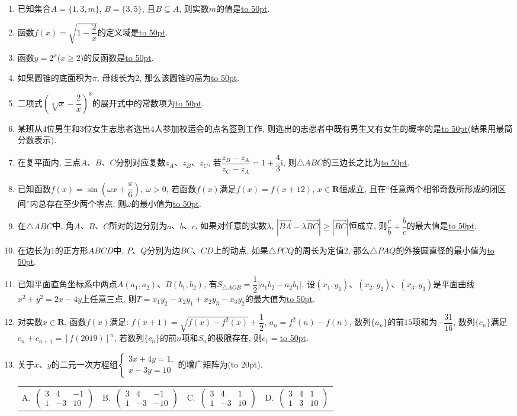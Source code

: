 \documentclass[10pt,a4paper]{article}
\newcommand{\blank}[1]{\underline{\hbox to #1pt{}}}
\newcommand{\bracket}[1]{(\hbox to #1pt{})}
\newcommand{\fourch}[4]{\par\begin{tabular}{p{.23\textwidth}p{.23\textwidth}p{.23\textwidth}p{.23\textwidth}}
A.~#1 &B.~#2& C.~#3& D.~#4
\end{tabular}}
\begin{document}
\begin{enumerate}[1.]
\item 已知集合$A=\{1,3,m\}$, $B=\{3,5\}$, 且$B\subseteq A$, 则实数$m$的值是\blank{50}.
\item 函数$f(x)=\sqrt{1-\dfrac 2x}$的定义域是\blank{50}.
\item 函数$y=2^x$($x\ge 2$)的反函数是\blank{50}.
\item 如果圆锥的底面积为$\pi$, 母线长为$2$, 那么该圆锥的高为\blank{50}.
\item 二项式$(\sqrt[3]x-\dfrac 2x)^8$的展开式中的常数项为\blank{50}.
\item 某班从$4$位男生和$3$位女生志愿者选出$4$人参加校运会的点名签到工作, 则选出的志愿者中既有男生又有女生的概率的是\blank{50}(结果用最简分数表示).
\item 在复平面内, 三点$A$、$B$、$C$分别对应复数$z_A$、$z_B$、$z_C$, 若$\dfrac{z_B-z_A}{z_C-z_A}=1+\dfrac 43\mathrm{i}$, 则$\triangle ABC$的三边长之比为\blank{50}.
\item 已知函数$f(x)=\sin (\omega x+\dfrac{\pi }6), \ \omega >0$, 若函数$f(x)$满足$f(x)=f(x+12)$, $x\in \mathbf{R}$恒成立, 且在``任意两个相邻奇数所形成的闭区间''内总存在至少两个零点, 则$\omega$的最小值为\blank{50}.
\item 在$\triangle ABC$中, 角$A$、$B$、$C$所对的边分别为$a$、$b$、$c$, 如果对任意的实数$\lambda$, $|\overrightarrow{BA}-\lambda \overrightarrow{BC}|\ge |\overrightarrow{BC}|$恒成立, 则$\dfrac cb+\dfrac bc$的最大值是\blank{50}.
\item 在边长为1的正方形$ABCD$中, $P$、$Q$分别为边$BC$、$CD$上的动点, 如果$\triangle PCQ$的周长为定值$2$, 那么$\triangle PAQ$的外接圆直径的最小值为\blank{50}.
\item 已知平面直角坐标系中两点$A(a_1,a_2)$、$B(b_1,b_2)$, 有$S_{\triangle AOB}=\dfrac 12|a_1b_2-a_2b_1|$. 设$(x_1,y_1)$、$(x_2,y_2)$、$(x_3,y_3)$是平面曲线$x^2+y^2=2x-4y$上任意三点, 则$T=x_1y_2-x_2y_1+x_2y_3-x_3y_2$的最大值为\blank{50}.
\item 对实数$x\in \mathbf{R}$, 函数$f(x)$满足: $f(x+1)=\sqrt{f(x)-{f^2}(x)}+\dfrac 12$, $a_n=f^2(n)-f(n)$,
数列$\{a_n\}$的前$15$项和为$-\dfrac{31}{16}$, 数列$\{c_n\}$满足$c_n+c_{n+1}=[f(2019)]^n$, 若数列$\{c_n\}$的前$n$项和$S_n$的极限存在, 则$c_1=$\blank{50}.
\item 关于$x$、$y$的二元一次方程组$\begin{cases} 3x+4y=1,\\ x-3y=10 \end{cases}$的增广矩阵为\bracket{20}.
\fourch{$\begin{pmatrix}3&4&-1\\1&-3&10\end{pmatrix}$}{$\begin{pmatrix}3&4&-1\\1&-3&-10\end{pmatrix}$}{$\begin{pmatrix}3&4&1\\1&-3&10\end{pmatrix}$}{$\begin{pmatrix}3&4&1\\1&3&10\end{pmatrix}$}

\end{enumerate}
\end{document}
